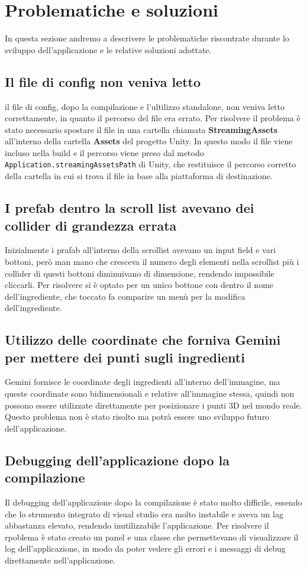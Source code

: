 \section{Problematiche e soluzioni}
In questa sezione andremo a descrivere le problematiche riscontrate durante lo sviluppo dell'applicazione e le relative soluzioni adottate.
\subsection{Il file di config non veniva letto}
il file di config, dopo la compilazione e l'ultilizzo standalone, non veniva letto correttamente, in quanto il percorso del file era errato. Per risolvere il problema è stato necessario spostare il file in una cartella chiamata \textbf{StreamingAssets} all'interno della cartella \textbf{Assets} del progetto Unity. In questo modo il file viene incluso nella build e il percorso viene preso dal metodo \texttt{Application.streamingAssetsPath} di Unity, che restituisce il percorso corretto della cartella in cui si trova il file in base alla piattaforma di destinazione.

\subsection{I prefab dentro la scroll list avevano dei collider di grandezza errata}
Inizialmente i prafab all'interno della scrollist avevano un input field e vari bottoni, però man mano che cresceva il numero degli elementi nella scrollist più i collider di questi bottoni diminuivano di dimensione, rendendo impossibile cliccarli. Per risolvere si è optato per un unico bottone con dentro il nome dell'ingrediente, che toccato fa comparire un menù per la modifica dell'ingrediente.
\subsection{Utilizzo delle coordinate che forniva Gemini per mettere dei punti sugli ingredienti}
Gemini fornisce le coordinate degli ingredienti all'interno dell'immagine, ma queste coordinate sono bidimensionali e relative all'immagine stessa, quindi non possono essere utilizzate direttamente per posizionare i punti 3D nel mondo reale. Questo problema non è stato risolto ma potrà essere uno sviluppo futuro dell'applicazione.

\subsection{Debugging dell'applicazione dopo la compilazione}
Il debugging dell'applicazione dopo la compilazione è stato molto difficile, essendo che lo strumento integrato di visual studio era molto instabile e aveva un lag abbastanza elevato, rendendo inutilizzabile l'applicazione. Per risolvere il rpoblema è stato creato un panel e una classe che permettevano di visualizzare il log dell'applicazione, in modo da poter vedere gli errori e i messaggi di debug direttamente nell'applicazione.